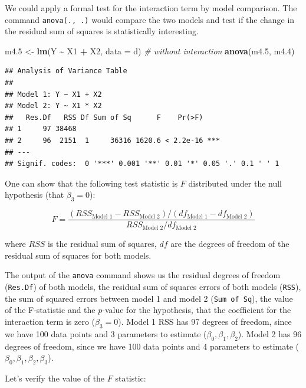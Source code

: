 \documentclass[
]{book}
\newenvironment{Shaded}{\begin{snugshade}}{\end{snugshade}}
\newcommand{\AttributeTok}[1]{\textcolor[rgb]{0.13,0.29,0.53}{#1}}
\newcommand{\CommentTok}[1]{\textcolor[rgb]{0.56,0.35,0.01}{\textit{#1}}}
\newcommand{\FloatTok}[1]{\textcolor[rgb]{0.00,0.00,0.81}{#1}}
\newcommand{\FunctionTok}[1]{\textcolor[rgb]{0.13,0.29,0.53}{\textbf{#1}}}
\newcommand{\NormalTok}[1]{#1}
\newcommand{\OtherTok}[1]{\textcolor[rgb]{0.56,0.35,0.01}{#1}}
\newcommand{\SpecialCharTok}[1]{\textcolor[rgb]{0.81,0.36,0.00}{\textbf{#1}}}
\begin{document}
We could apply a formal test for the interaction term by model comparison.
The command \texttt{anova(.,\ .)} would compare the two models and test if the change in the
residual sum of squares is statistically interesting.

\begin{Shaded}
\begin{Highlighting}[]
\NormalTok{m4}\FloatTok{.5} \OtherTok{\textless{}{-}} \FunctionTok{lm}\NormalTok{(Y }\SpecialCharTok{\textasciitilde{}}\NormalTok{ X1 }\SpecialCharTok{+}\NormalTok{ X2, }\AttributeTok{data =}\NormalTok{ d) }\CommentTok{\# without interaction}
\FunctionTok{anova}\NormalTok{(m4}\FloatTok{.5}\NormalTok{, m4}\FloatTok{.4}\NormalTok{)}
\end{Highlighting}
\end{Shaded}

\begin{verbatim}
## Analysis of Variance Table
## 
## Model 1: Y ~ X1 + X2
## Model 2: Y ~ X1 * X2
##   Res.Df   RSS Df Sum of Sq      F    Pr(>F)    
## 1     97 38468                                  
## 2     96  2151  1     36316 1620.6 < 2.2e-16 ***
## ---
## Signif. codes:  0 '***' 0.001 '**' 0.01 '*' 0.05 '.' 0.1 ' ' 1
\end{verbatim}

One can show that the following test statistic is \(F\) distributed under the null hypothesis (that \(\beta_3=0\)):

\[ F = \frac{\left(RSS_{\text{Model 1}} - RSS_{\text{Model 2}}\right) / \left(df_{\text{Model 1}} - df_{\text{Model 2}}\right)}{RSS_{\text{Model 2}} / df_{\text{Model 2}}}\]

where \(RSS\) is the residual sum of squares,
\(df\) are the degrees of freedom of the residual sum of squares for both models.

The output of the \texttt{anova} command shows us the residual degrees of freedom (\texttt{Res.Df})
of both models, the residual sum of squares errors of both models (\texttt{RSS}),
the sum of squared errors between model 1 and model 2 (\texttt{Sum\ of\ Sq}), the value of the
F-statistic and the \(p\)-value for the hypothesis, that the coefficient for
the interaction term is zero (\(\beta_3=0\)). Model 1 RSS has 97 degrees of freedom, since we have 100 data points
and 3 parameters to estimate (\(\beta_0, \beta_1, \beta_2\)). Model 2 has 96 degrees of freedom, since
we have 100 data points and 4 parameters to estimate (\(\beta_0, \beta_1, \beta_2, \beta_3\)).

Let's verify the value of the \(F\) statistic:
\end{document}

